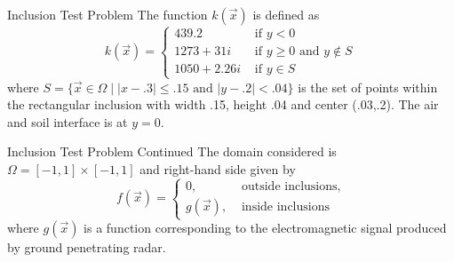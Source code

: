 \documentclass[handout]{beamer}
\begin{document}



\begin{frame}{Inclusion Test Problem}
The function $k(\vec{x})$ is defined as
\[k(\vec{x}) = \begin{cases}
439.2 & \text{ if } y < 0\\
1273+31i & \text{ if } y\ge 0 \text{ and }y\notin S \\
1050+2.26i & \text{ if } y\in S
\end{cases}\]
where $S=\{\vec{x}\in\Omega\mid |x-.3|\le .15 \text{ and } |y-.2|<.04 \}$ is the set of points within the rectangular inclusion with width .15, height .04 and center (.03,.2). The air and soil interface is at $y=0$.
\end{frame}

\begin{frame}{Inclusion Test Problem Continued}
The domain considered is $\Omega = [-1,1]\times[-1,1]$ and right-hand side given by
\[f(\vec{x})=
\begin{cases}
0, &\text{ outside inclusions,}\\
g(\vec{x}), &\text{ inside inclusions}
\end{cases}\]
where $g(\vec{x})$ is a function corresponding to the electromagnetic signal produced by ground penetrating radar.
\end{frame}
\end{document}
